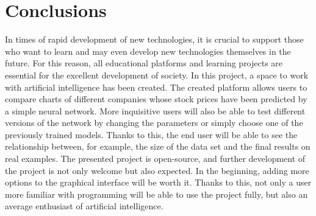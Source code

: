 \chapter{Conclusions}

In times of rapid development of new technologies, it is crucial to support those who want to learn and may even develop new technologies themselves in the future. For this reason, all educational platforms and learning projects are essential for the excellent development of society.
In this project, a space to work with artificial intelligence has been created. The created platform allows users to compare charts of different companies whose stock prices have been predicted by a simple neural network. More inquisitive users will also be able to test different versions of the network by changing the parameters or simply choose one of the previously trained models. Thanks to this, the end user will be able to see the relationship between, for example, the size of the data set and the final results on real examples.
The presented project is open-source, and further development of the project is not only welcome but also expected. In the beginning, adding more options to the graphical interface will be worth it. Thanks to this, not only a user more familiar with programming will be able to use the project fully, but also an average enthusiast of artificial intelligence.